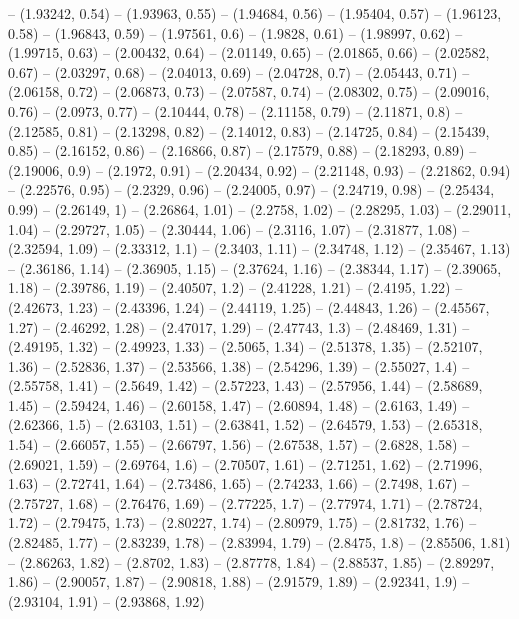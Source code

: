 -- (1.93242, 0.54)
-- (1.93963, 0.55)
-- (1.94684, 0.56)
-- (1.95404, 0.57)
-- (1.96123, 0.58)
-- (1.96843, 0.59)
-- (1.97561, 0.6)
-- (1.9828, 0.61)
-- (1.98997, 0.62)
-- (1.99715, 0.63)
-- (2.00432, 0.64)
-- (2.01149, 0.65)
-- (2.01865, 0.66)
-- (2.02582, 0.67)
-- (2.03297, 0.68)
-- (2.04013, 0.69)
-- (2.04728, 0.7)
-- (2.05443, 0.71)
-- (2.06158, 0.72)
-- (2.06873, 0.73)
-- (2.07587, 0.74)
-- (2.08302, 0.75)
-- (2.09016, 0.76)
-- (2.0973, 0.77)
-- (2.10444, 0.78)
-- (2.11158, 0.79)
-- (2.11871, 0.8)
-- (2.12585, 0.81)
-- (2.13298, 0.82)
-- (2.14012, 0.83)
-- (2.14725, 0.84)
-- (2.15439, 0.85)
-- (2.16152, 0.86)
-- (2.16866, 0.87)
-- (2.17579, 0.88)
-- (2.18293, 0.89)
-- (2.19006, 0.9)
-- (2.1972, 0.91)
-- (2.20434, 0.92)
-- (2.21148, 0.93)
-- (2.21862, 0.94)
-- (2.22576, 0.95)
-- (2.2329, 0.96)
-- (2.24005, 0.97)
-- (2.24719, 0.98)
-- (2.25434, 0.99)
-- (2.26149, 1)
-- (2.26864, 1.01)
-- (2.2758, 1.02)
-- (2.28295, 1.03)
-- (2.29011, 1.04)
-- (2.29727, 1.05)
-- (2.30444, 1.06)
-- (2.3116, 1.07)
-- (2.31877, 1.08)
-- (2.32594, 1.09)
-- (2.33312, 1.1)
-- (2.3403, 1.11)
-- (2.34748, 1.12)
-- (2.35467, 1.13)
-- (2.36186, 1.14)
-- (2.36905, 1.15)
-- (2.37624, 1.16)
-- (2.38344, 1.17)
-- (2.39065, 1.18)
-- (2.39786, 1.19)
-- (2.40507, 1.2)
-- (2.41228, 1.21)
-- (2.4195, 1.22)
-- (2.42673, 1.23)
-- (2.43396, 1.24)
-- (2.44119, 1.25)
-- (2.44843, 1.26)
-- (2.45567, 1.27)
-- (2.46292, 1.28)
-- (2.47017, 1.29)
-- (2.47743, 1.3)
-- (2.48469, 1.31)
-- (2.49195, 1.32)
-- (2.49923, 1.33)
-- (2.5065, 1.34)
-- (2.51378, 1.35)
-- (2.52107, 1.36)
-- (2.52836, 1.37)
-- (2.53566, 1.38)
-- (2.54296, 1.39)
-- (2.55027, 1.4)
-- (2.55758, 1.41)
-- (2.5649, 1.42)
-- (2.57223, 1.43)
-- (2.57956, 1.44)
-- (2.58689, 1.45)
-- (2.59424, 1.46)
-- (2.60158, 1.47)
-- (2.60894, 1.48)
-- (2.6163, 1.49)
-- (2.62366, 1.5)
-- (2.63103, 1.51)
-- (2.63841, 1.52)
-- (2.64579, 1.53)
-- (2.65318, 1.54)
-- (2.66057, 1.55)
-- (2.66797, 1.56)
-- (2.67538, 1.57)
-- (2.6828, 1.58)
-- (2.69021, 1.59)
-- (2.69764, 1.6)
-- (2.70507, 1.61)
-- (2.71251, 1.62)
-- (2.71996, 1.63)
-- (2.72741, 1.64)
-- (2.73486, 1.65)
-- (2.74233, 1.66)
-- (2.7498, 1.67)
-- (2.75727, 1.68)
-- (2.76476, 1.69)
-- (2.77225, 1.7)
-- (2.77974, 1.71)
-- (2.78724, 1.72)
-- (2.79475, 1.73)
-- (2.80227, 1.74)
-- (2.80979, 1.75)
-- (2.81732, 1.76)
-- (2.82485, 1.77)
-- (2.83239, 1.78)
-- (2.83994, 1.79)
-- (2.8475, 1.8)
-- (2.85506, 1.81)
-- (2.86263, 1.82)
-- (2.8702, 1.83)
-- (2.87778, 1.84)
-- (2.88537, 1.85)
-- (2.89297, 1.86)
-- (2.90057, 1.87)
-- (2.90818, 1.88)
-- (2.91579, 1.89)
-- (2.92341, 1.9)
-- (2.93104, 1.91)
-- (2.93868, 1.92)
